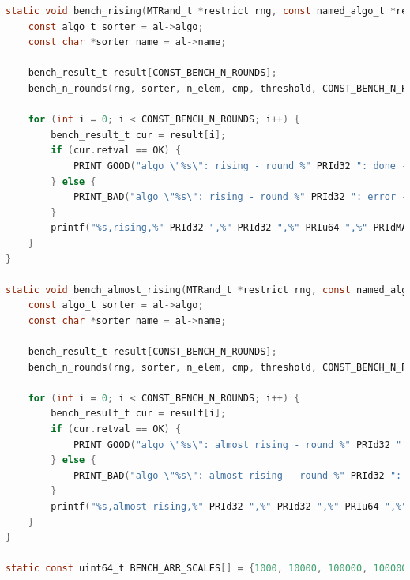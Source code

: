 \documentclass[12pt]{article}
\begin{document}
\begin{lstlisting}[language=C]
static void bench_rising(MTRand_t *restrict rng, const named_algo_t *restrict al, size_t n_elem, comp_t cmp, uint64_t threshold) {
    const algo_t sorter = al->algo;
    const char *sorter_name = al->name;

    bench_result_t result[CONST_BENCH_N_ROUNDS];
    bench_n_rounds(rng, sorter, n_elem, cmp, threshold, CONST_BENCH_N_ROUNDS, gen_rising_data, result);

    for (int i = 0; i < CONST_BENCH_N_ROUNDS; i++) {
        bench_result_t cur = result[i];
        if (cur.retval == OK) {
            PRINT_GOOD("algo \"%s\": rising - round %" PRId32 ": done - %" PRIu64 " comps - %" PRIdMAX ".%09" PRId32 " sec\n", sorter_name, i + 1, cur.comp_count, (intmax_t)cur.diff.tv_sec, cur.diff.tv_nsec);
        } else {
            PRINT_BAD("algo \"%s\": rising - round %" PRId32 ": error - %" PRIu64 " comps - %" PRIdMAX ".%09" PRId32 " sec\n", sorter_name, i + 1, cur.comp_count, (intmax_t)cur.diff.tv_sec, cur.diff.tv_nsec);
        }
        printf("%s,rising,%" PRId32 ",%" PRId32 ",%" PRIu64 ",%" PRIdMAX ".%09" PRId32 "\n", sorter_name, cur.retval, i + 1, cur.comp_count, (intmax_t)cur.diff.tv_sec, cur.diff.tv_nsec);
    }
}

static void bench_almost_rising(MTRand_t *restrict rng, const named_algo_t *restrict al, size_t n_elem, comp_t cmp, uint64_t threshold) {
    const algo_t sorter = al->algo;
    const char *sorter_name = al->name;

    bench_result_t result[CONST_BENCH_N_ROUNDS];
    bench_n_rounds(rng, sorter, n_elem, cmp, threshold, CONST_BENCH_N_ROUNDS, gen_almost_rising_data, result);

    for (int i = 0; i < CONST_BENCH_N_ROUNDS; i++) {
        bench_result_t cur = result[i];
        if (cur.retval == OK) {
            PRINT_GOOD("algo \"%s\": almost rising - round %" PRId32 ": done - %" PRIu64 " comps - %" PRIdMAX ".%09" PRId32 " sec\n", sorter_name, i + 1, cur.comp_count, (intmax_t)cur.diff.tv_sec, cur.diff.tv_nsec);
        } else {
            PRINT_BAD("algo \"%s\": almost rising - round %" PRId32 ": error - %" PRIu64 " comps - %" PRIdMAX ".%09" PRId32 " sec\n", sorter_name, i + 1, cur.comp_count, (intmax_t)cur.diff.tv_sec, cur.diff.tv_nsec);
        }
        printf("%s,almost rising,%" PRId32 ",%" PRId32 ",%" PRIu64 ",%" PRIdMAX ".%09" PRId32 "\n", sorter_name, cur.retval, i + 1, cur.comp_count, (intmax_t)cur.diff.tv_sec, cur.diff.tv_nsec);
    }
}

static const uint64_t BENCH_ARR_SCALES[] = {1000, 10000, 100000, 1000000, 10000000};


\end{lstlisting}
\end{document}
